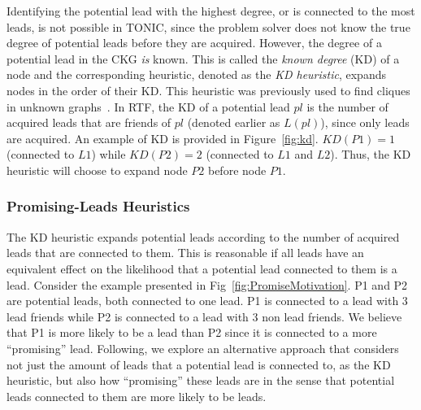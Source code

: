 \documentclass[journal]{IEEEtran}
\begin{document}
Identifying the potential lead with the highest degree, or is connected to the most leads, is not possible in TONIC, since the problem solver does not know the true degree of potential leads before they are acquired. However, the degree of a potential lead in the CKG {\em is} known. This is called the {\em known degree} (KD) of a node and the corresponding heuristic, denoted as the {\em KD heuristic}, expands nodes in the order of their KD. This heuristic was previously used to find cliques in unknown graphs~\cite{stern2012findingPatterns}. In RTF, the KD of a potential lead $pl$ is the number of acquired leads that are friends of $pl$ (denoted earlier as $L(pl)$), since only leads are acquired. An example of KD is provided in Figure~\ref{fig:kd}.
$KD(P1)=1$ (connected to $L1$) while $KD(P2)=2$ (connected to $L1$ and $L2$). Thus, the KD  heuristic will choose to expand node $P2$ before node $P1$.


\subsubsection{Promising-Leads Heuristics}
\label{sec:promising}

The KD heuristic expands potential leads according to the number of acquired leads that are connected to them. This is reasonable if all leads have an equivalent effect on the likelihood that a potential lead connected to them is a lead.
Consider the example presented in Fig~\ref{fig:PromiseMotivation}. P1 and P2 are potential leads, both connected to one lead. P1 is connected to a lead with 3 lead friends while P2 is connected to a lead with 3 non lead friends. 
We believe that P1 is more likely to be a lead than P2 since it is connected to a more ``promising'' lead.
 Following, we explore an alternative approach that considers not just the amount of leads that a potential lead is connected to, as the KD heuristic, but also how ``promising'' these leads are %
 in the sense that potential leads connected to them are more likely to be leads. 
\end{document}
